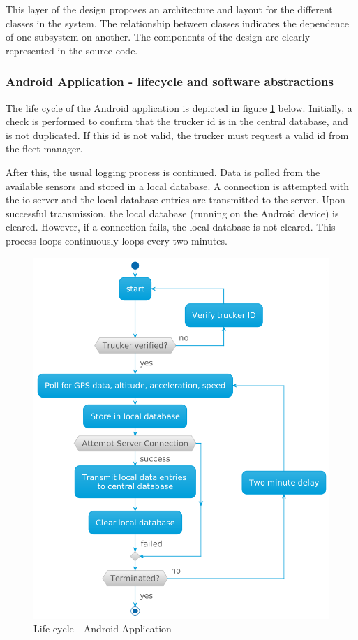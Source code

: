 This layer of the design proposes an architecture and layout for the different classes in the system.
The relationship between classes indicates the dependence of one subsystem on another.
The components of the design are clearly represented in the source code.

\subsubsection{Android Application - lifecycle and software abstractions}
The life cycle of the Android application is depicted in figure \ref{fig:android_activity} below.
Initially, a check is performed to confirm that the trucker \ac{id} is in the central database, and is not duplicated.
If this \ac{id} is not valid, the trucker must request a valid \ac{id} from the fleet manager.

After this, the usual logging process is continued.
Data is polled from the available sensors and stored in a local database.
A connection is attempted with the \ac{io} server and the local database entries are transmitted to the server.
Upon successful transmission, the local database (running on the Android device) is cleared.
However, if a connection fails, the local database is not cleared.
This process loops continuously loops every two minutes.

\begin{figure}[H]
\centering
\includegraphics[scale=0.4]{../diag/android_activity.png}
\caption{Life-cycle - Android Application}
\label{fig:android_activity}
\end{figure}
 

